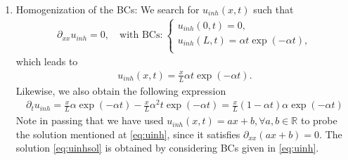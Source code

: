 \documentclass[12pt]{article}
\begin{document}
\begin{enumerate}
	\item Homogenization of the BCs: We search for $u_{inh}(x,t)$ such that
	      \begin{align}
		      \label{eq:uinh}
		      \partial_{xx}u_{inh} = 0, \quad \text{with BCs:}\ 
		      \begin{cases}
			      u_{inh}(0,t) = 0,                        \\
			      u_{inh}(L,t) = \alpha t \exp(-\alpha t), \\
		      \end{cases}
	      \end{align}
	      which leads to
	      \begin{align}
		      \label{eq:uinhsol}
		      \boxed{
			      u_{inh}(x,t) = \frac{x}{L}\alpha t \exp(-\alpha t).
		      }
	      \end{align}
	      Likewise, we also obtain the following expression
	      \begin{align}
		      \label{eq:ptuinh}
		      \partial_{t}u_{inh} 
		      = \frac{x}{L}\alpha \exp(-\alpha t) - \frac{x}{L}\alpha^{2} t \exp(-\alpha t)
		      = \frac{x}{L}(1-\alpha t)\alpha \exp(-\alpha t)
	      \end{align}
	      Note in passing that we have used $u_{inh}(x,t) = ax+b, \forall a,b \in\mathbb{R}$
	      to probe the solution mentioned at \eqref{eq:uinh}, since it satisfies $\partial_{xx}(ax+b) = 0$.
	      The solution \eqref{eq:uinhsol} is obtained by considering BCs given in \eqref{eq:uinh}.
	      

\end{enumerate}
\end{document}
